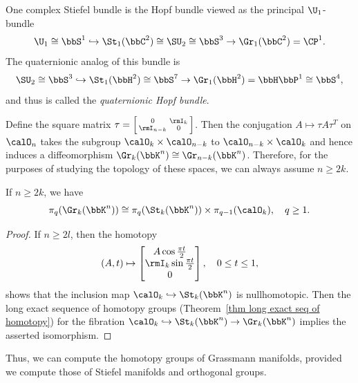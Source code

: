 \begin{example}
    One complex Stiefel bundle is the Hopf bundle viewed as the principal $\U_1$-bundle
    \[\U_1\cong\bbS^1\hookrightarrow \St_1(\bbC^2)\cong \SU_2\cong\bbS^3\to \Gr_1(\bbC^2)=\CP^1.\]
    The quaternionic analog of this bundle is 
    \[\SU_2\cong \bbS^3\hookrightarrow \St_1(\bbH^2)\cong \bbS^7\to \Gr_1(\bbH^2)=\bbH\bbP^1\cong \bbS^4,\]
    and thus is called the \emph{quaternionic Hopf bundle}.
\end{example}

\begin{rem}
   Define the square matrix $\tau=\left[\begin{smallmatrix}
       0&\rmI_k\\\rmI_{n-k}&0
   \end{smallmatrix}\right]$. 
   Then the conjugation $A\mapsto \tau A\tau^T$ on $\calO_n$ takes the subgroup $\calO_k\times\calO_{n-k}$ to $\calO_{n-k}\times\calO_{k}$ and hence induces a diffeomorphism $\Gr_k(\bbK^n)\cong \Gr_{n-k}(\bbK^n)$. Therefore, for the purposes of studying the topology of these spaces, we can always assume $n\geq 2k$.
\end{rem}


\begin{prop}\label{prop 10.9.5 Shastri}
    If $n\geq 2k$, we have
    \[\pi_q(\Gr_k(\bbK^n))\cong \pi_q(\St_k(\bbK^n))\times \pi_{q-1}(\calO_k),\quad q\geq 1.\]
\end{prop}
\begin{proof}
    If $n\geq 2l$, then the homotopy
\[(A,t)\mapsto \begin{bmatrix}
    A\cos\frac{\pi t}{2}\\
    \rmI_k \sin\frac{\pi t}{2}\\
    0
\end{bmatrix},\quad 0\leq t\leq 1,\]
shows that the inclusion map $\calO_k\hookrightarrow \St_{k}(\bbK^n)$ is nullhomotopic. Then the long exact sequence of homotopy groups (Theorem~\ref{thm long exact seq of homotopy}) for the fibration $\calO_k\hookrightarrow \St_k(\bbK^n)\to \Gr_k(\bbK^n)$ implies the asserted isomorphism.
\end{proof}

Thus, we can compute the homotopy groups of Grassmann manifolds, provided we compute those of Stiefel manifolds and orthogonal groups. 

